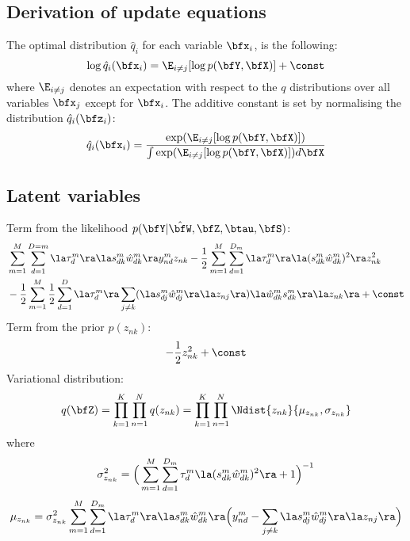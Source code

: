 \documentclass[10pt, a4paper,openany]{report}
\begin{document}
\subsection{Derivation of update equations}
The optimal distribution $\hat{q}_i$ for each variable $\bfx_i$, is the following:
\begin{equation} \label{eq:optimal_q_dist}
\log \hat{q}_i(\bfx_i) = \E_{i \neq j} [\log p(\bfY,\bfX)] + \const
\end{equation}
where $\E_{i \neq j}$ denotes an expectation with respect to the $q$ distributions over all variables $\bfx_j$ except for $\bfx_i$.
The additive constant is set by normalising the distribution $\hat{q}_i(\bfz_i)$:
\[
\hat{q}_i(\bfx_i) = \frac{\exp(\E_{i \neq j}[\log p(\bfY,\bfX)])}{\int \exp(\E_{i \neq j}[\log p(\bfY,\bfX)]) d\bfX}
\]

\subsection*{Latent variables}
Term from the likelihood $p(\bfY|\hat{\bfW},\bfZ,\btau,\bfS)$:
\begin{align*}
&\sum_{m=1}^{M} \sum_{d=1}^{D=m} \la\tau_d^m\ra \la s_{dk}^m \hat{w}_{dk}^m \ra y_{nd}^m z_{nk}
-\frac{1}{2}\sum_{m=1}^{M} \sum_{d=1}^{D_m} \la\tau_d^m\ra \la (s_{dk}^m\hat{w}_{dk}^m)^2 \ra z_{nk}^2 \\
&-\frac{1}{2}\sum_{m=1}^{M} \frac{1}{2}\sum_{d=1}^{D} \la\tau_d^m\ra \sum_{j \neq k} (\la s_{dj}^m \hat{w}^m_{dj} \ra \la z_{nj} \ra) \la\hat{w}^m_{dk} s_{dk}^m \ra \la z_{nk} \ra + \const
\end{align*}
Term from the prior $p(z_{nk})$:
\[
-\frac{1}{2} z_{nk}^2 + \const
\]
Variational distribution:
\[
q(\bfZ) = \prod_{k=1}^{K} \prod_{n=1}^{N} q(z_{nk}) = \prod_{k=1}^{K} \prod_{n=1}^{N} \Ndist{z_{nk}}{\mu_{z_{nk}},\sigma_{z_{nk}}}
\]
where
\[
\sigma_{z_{nk}}^2 = \Big( \sum_{m=1}^{M} \sum_{d=1}^{D_m} \tau_d^m \la (s_{dk}^m\hat{w}_{dk}^m)^2 \ra + 1 \Big)^{-1}
\]
\[
\mu_{z_{nk}} = \sigma_{z_{nk}}^2 \sum_{m=1}^{M} \sum_{d=1}^{D_m} \la\tau_d^m\ra \la s_{dk}^m\hat{w}_{dk}^m \ra \Big( y_{nd}^m - \sum_{j \neq k} \la s_{dj}^m \hat{w}_{dj}^m \ra \la z_{nj} \ra \Big)
\]
\end{document}
